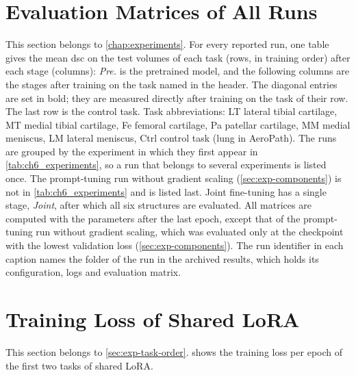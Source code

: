 \FloatBarrier
\section{Evaluation Matrices of All Runs}
\label{sec:app-matrices}

This section belongs to \cref{chap:experiments}.
For every reported run, one table gives the mean \gls{dsc} on the test volumes of each task (rows, in training order) after each stage (columns): \emph{Pre.} is the pretrained model, and the following columns are the stages after training on the task named in the header.
The diagonal entries are set in bold; they are measured directly after training on the task of their row.
The last row is the control task.
Task abbreviations: LT lateral tibial cartilage, MT medial tibial cartilage, Fe femoral cartilage, Pa patellar cartilage, MM medial meniscus, LM lateral meniscus, Ctrl control task (lung in AeroPath).
The runs are grouped by the experiment in which they first appear in \cref{tab:ch6_experiments}, so a run that belongs to several experiments is listed once.
The prompt-tuning run without gradient scaling (\cref{sec:exp-components}) is not in \cref{tab:ch6_experiments} and is listed last.
Joint fine-tuning has a single stage, \emph{Joint}, after which all six structures are evaluated.
All matrices are computed with the parameters after the last epoch, except that of the prompt-tuning run without gradient scaling, which was evaluated only at the checkpoint with the lowest validation loss (\cref{sec:exp-components}).
The run identifier in each caption names the folder of the run in the archived results, which holds its configuration, logs and evaluation matrix.

\raggedbottom


\FloatBarrier
\section{Training Loss of Shared LoRA}
\label{sec:app-shared-loss}

This section belongs to \cref{sec:exp-task-order}.
 shows the training loss per epoch of the first two tasks of shared LoRA.

